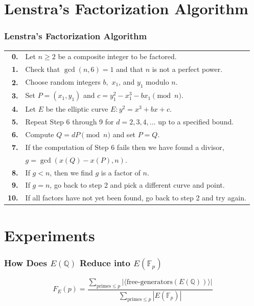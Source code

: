 \documentclass{beamer}
\newcommand{\Q}{\mathbb{Q}}
\newcommand{\F}{\mathbb{F}}
\begin{document}
\section{Lenstra's Factorization Algorithm}
\begin{frame}
\frametitle{Lenstra's Factorization Algorithm}
{\scriptsize
\begin{table}[htbp]
\centering
  \centering
  \begin{tabular}{|r l|}
  \hline
  \textbf{0.} & Let $n \geq 2$ be a composite integer to be factored. \\
  \textbf{1.} & Check that $\gcd(n,6) = 1$ and that $n$ is not a perfect power. \\
  \textbf{2.} & Choose random integers $b,$ $x_1$, and $y_1$ modulo $n$. \\
  \textbf{3.} & Set $P = (x_1,y_1)$ and $c = y_1^2 - x_1^3 - bx_1 \pmod n$. \\
  \textbf{4.} & Let $E$ be the elliptic curve $E : y^2 = x^3 + bx + c$. \\
  \textbf{5.} & Repeat Step 6 through 9 for $d = 2,3,4,\hdots$ up to a specified bound. \\
  \textbf{6.} & \hspace{.25in} Compute $Q = dP \pmod n$ and set $P = Q$. \\
   \textbf{7.} & \hspace{.25in} If the computation of Step 6 fails then we have found a divisor, \\
   & \hspace{.25in} $g = \gcd(x(Q) - x(P), n)$. \\
  \textbf{8.} & \hspace{.25in} If $g < n$, then we find $g$ is a factor of $n$. \\
  \textbf{9.} & \hspace{.25in} If $g = n$, go back to step 2 and pick a different curve and point. \\
  \textbf{10.} & If all factors have not yet been found, go back to step 2 and try again.\\
  \hline
  \end{tabular}
\end{table}
}
\end{frame}

\section{Experiments}
\begin{frame}
\frametitle{How Does $E(\Q)$ Reduce into $E(\F_p)$}
\[ F_E(p) = \frac{\displaystyle\sum_{\text{primes}\leq p}|\langle \text{free-generators}(E(\Q)) \rangle|}{\displaystyle\sum_{\text{primes} \leq p} |E(\F_p)|}\] 
\end{frame}
\end{document}
